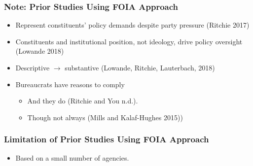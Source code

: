 \documentclass[13pt]{beamer}
\begin{document}
\begin{frame}
\frametitle{Note: Prior Studies Using FOIA Approach}
\begin{itemize}
 \item Represent constituents' policy demands despite party pressure (Ritchie 2017) 
 \item Constituents and institutional position, not ideology, drive policy oversight (Lowande 2018) 
 \item Descriptive $\rightarrow$ substantive (Lowande, Ritchie, Lauterbach, 2018)
 \item Bureaucrats have reasons to comply
   \begin{itemize} 
     \item And they do (Ritchie and You n.d.). 
    \item Though not always (Mills and Kalaf-Hughes 2015))
\end{itemize}
\end{itemize}

\end{frame}
\begin{frame}
\frametitle{Limitation of Prior Studies Using FOIA Approach}

\LARGE

\begin{itemize}
\item Based on a small number of agencies.
\end{itemize}

\end{frame}
\end{document}

